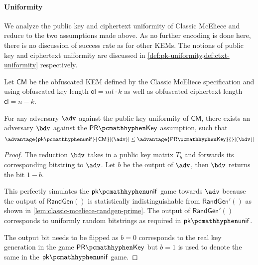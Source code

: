 \paragraph{Uniformity}

We analyze the public key and ciphertext uniformity of Classic McEliece and reduce to the two assumptions made above. As no further encoding is done here, there is no discussion of success rate as for other KEMs.
The notions of public key and ciphertext uniformity are discussed in \cref{def:pk-uniformity,def:ctxt-uniformity} respectively.

\begin{lemma} \label{lem:classic-mceliece-pk-unif}
    Let $\mathsf{CM}$ be the obfuscated KEM defined by the Classic McEliece specification \cite{NISTPQC-R4:ClassicMcEliece22} and using obfuscated key length $\mathsf{ol} = mt \cdot k$ as well as obfuscated ciphertext length $\mathsf{cl} = n-k$.
    
    For any adversary $\adv$ against the public key uniformity of $\mathsf{CM}$, there exists an adversary $\bdv$ against the $\prkey$ assumption, such that
    \[ \advantage{\pkunif}{\mathsf{CM}}[(\adv)] \leq \advantage{\prkey}{}[(\bdv)] \]
\end{lemma}
\begin{proof}
    The reduction $\bdv$ takes in a public key matrix $T_b$ and forwards its corresponding bitstring to $\adv$. Let $b$ be the output of $\adv$, then $\bdv$ returns the bit $1-b$.

    This perfectly simulates the $\pkunif$ game towards $\adv$ because the output of $\textsf{RandGen}()$ is statistically indistinguishable from $\textsf{RandGen}'()$ as shown in \cref{lem:classic-mceliece-randgen-prime}. The output of $\textsf{RandGen}'()$ corresponds to uniformly random bitstrings as required in $\pkunif$.

    The output bit needs to be flipped as $b=0$ corresponds to the real key generation in the game $\prkey$ but $b=1$ is used to denote the same in the $\pkunif$ game.
\end{proof}

